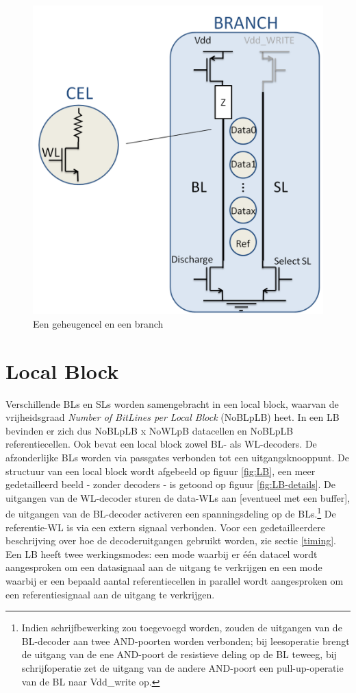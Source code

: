 \begin{figure}
  \centering
  \includegraphics[scale=0.3]{../fig/hfdstk-architecture-cell-branch.png}
  \caption{Een geheugencel en een branch}
  \label{fig:cellbranch}
\end{figure}

\section{Local Block}
Verschillende BLs en SLs worden samengebracht in een local block, waarvan de vrijheidsgraad \emph{Number of BitLines per Local Block} (NoBLpLB) heet. In een LB bevinden er zich dus NoBLpLB x NoWLpB datacellen en NoBLpLB referentiecellen. Ook bevat een local block zowel BL- als WL-decoders. De afzonderlijke BLs worden via passgates verbonden tot een uitgangsknooppunt.
De structuur van een local block wordt afgebeeld op figuur \ref{fig:LB}, een meer gedetailleerd beeld - zonder decoders - is getoond op figuur \ref{fig:LB-details}.
De uitgangen van de WL-decoder sturen de data-WLs aan [eventueel met een buffer], de uitgangen van de BL-decoder activeren een spanningsdeling op de BLs.\footnote{Indien schrijfbewerking zou toegevoegd worden, zouden de uitgangen van de BL-decoder aan twee AND-poorten worden verbonden; bij leesoperatie brengt de uitgang van de ene AND-poort de resistieve deling op de BL teweeg, bij schrijfoperatie zet de uitgang van de andere AND-poort een pull-up-operatie van de BL naar Vdd\_write op.} De referentie-WL is via een extern signaal verbonden. Voor een gedetailleerdere beschrijving over hoe de decoderuitgangen gebruikt worden, zie sectie \ref{timing}.
Een LB heeft twee werkingsmodes: een mode waarbij er één datacel wordt aangesproken om een datasignaal aan de uitgang te verkrijgen en een mode waarbij er een bepaald aantal referentiecellen in parallel wordt aangesproken om een referentiesignaal aan de uitgang te verkrijgen.

